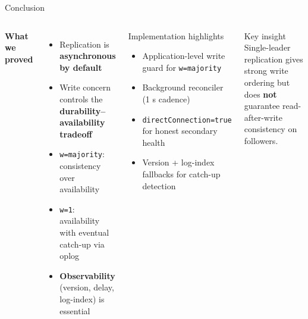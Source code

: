 \documentclass[aspectratio=169]{beamer}
\begin{document}
\begin{frame}{Conclusion}
  \begin{columns}
      \small\textbf{What we proved}
      \begin{itemize}\small
        \item Replication is \textbf{asynchronous by default}
        \item Write concern controls the \textbf{durability--availability tradeoff}
        \item \texttt{w=majority}: consistency over availability
        \item \texttt{w=1}: availability with eventual catch-up via oplog
        \item \textbf{Observability} (version, delay, log-index) is essential
      \end{itemize}
      \begin{block}{Implementation highlights}
        \footnotesize
        \begin{itemize}
          \item Application-level write guard for \texttt{w=majority}
          \item Background reconciler (1 s cadence)
          \item \texttt{directConnection=true} for honest secondary health
          \item Version + log-index fallbacks for catch-up detection
        \end{itemize}
      \end{block}
      \begin{alertblock}{Key insight}
        \footnotesize Single-leader replication gives strong write ordering but does \textbf{not} guarantee read-after-write consistency on followers.
      \end{alertblock}
  \end{columns}
\end{frame}
\end{document}
